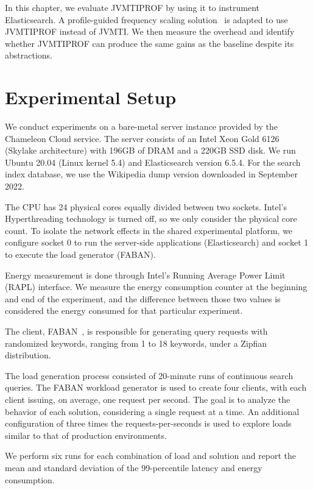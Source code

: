 \label{cap:evaluation}

In this chapter, we evaluate JVMTIPROF by using it to instrument Elasticsearch. A profile-guided frequency scaling solution~\cite{hurryupccgrid} is adapted to use JVMTIPROF instead of JVMTI. We then measure the overhead and identify whether JVMTIPROF can produce the same gains as the baseline despite its abstractions.

\section{Experimental Setup}

We conduct experiments on a bare-metal server instance provided by the Chameleon Cloud service. The server consists of an Intel Xeon Gold 6126 (Skylake architecture) with 196GB of DRAM and a 220GB SSD disk. We run Ubuntu 20.04 (Linux kernel 5.4) and Elasticsearch version 6.5.4. For the search index database, we use the Wikipedia dump version  downloaded in September 2022.

The CPU has 24 physical cores equally divided between two sockets. Intel's Hyperthreading technology is turned off, so we only consider the physical core count. To isolate the network effects in the shared experimental platform, we configure socket 0 to run the server-side applications (Elasticsearch) and socket 1 to execute the load generator (FABAN).

Energy measurement is done through Intel's Running Average Power Limit (RAPL) interface. We measure the energy consumption counter at the beginning and end of the experiment, and the difference between those two values is considered the energy consumed for that particular experiment.

The client, FABAN~\cite{faban}, is responsible for generating query requests with randomized keywords, ranging from 1 to 18 keywords, under a Zipfian distribution.

The load generation process consisted of 20-minute runs of continuous search queries. The FABAN workload generator is used to create four clients, with each client issuing, on average, one request per second. The goal is to analyze the behavior of each solution, considering a single request at a time. An additional configuration of three times the requests-per-seconds is used to explore loads similar to that of production environments.

We perform six runs for each combination of load and solution and report the mean and standard deviation of the 99-percentile latency and energy consumption.

